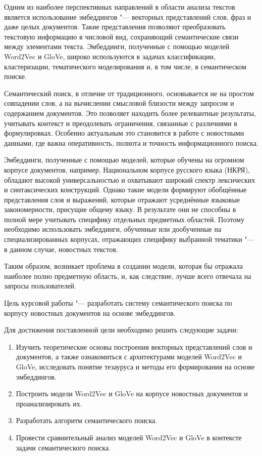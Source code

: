 \documentclass[coursework]{SCWorks}
\begin{document}
Одним из наиболее перспективных направлений в области анализа текстов является использование эмбеддингов "--- векторных представлений слов, фраз и даже целых документов. Такие представления позволяют преобразовать текстовую информацию в числовой вид, сохраняющий семантические связи между элементами текста. Эмбеддинги, полученные с помощью моделей Word2Vec и GloVe, широко используются в задачах классификации, кластеризации, тематического моделирования и, в том числе, в семантическом поиске.

Семантический поиск, в отличие от традиционного, основывается не на простом совпадении слов, а на вычислении смысловой близости между запросом и содержанием документов. Это позволяет находить более релевантные результаты, учитывать контекст и преодолевать ограничения, связанные с различиями в формулировках. Особенно актуальным это становится в работе с новостными данными, где важна оперативность, полнота и точность информационного поиска.

Эмбеддинги, полученные с помощью моделей, которые обучены на огромном корпусе документов, например, Национальном корпусе русского языка (НКРЯ), обладают высокой универсальностью и охватывают широкий спектр лексических и синтаксических конструкций. Однако такие модели формируют обобщённые представления слов и выражений, которые отражают усреднённые языковые закономерности, присущие общему языку. В результате они не способны в полной мере учитывать специфику отдельных предметных областей.
Поэтому необходимо использовать эмбеддинги, обученные или дообученные на специализированных корпусах, отражающих специфику выбранной тематики "--- в данном случае, новостных текстов.

Таким образом, возникает проблема в создании модели, которая бы отражала наиболее полно предметную область, и, как следствие, лучше всего отвечала на запросы пользователей. 

Цель курсовой работы "--- разработать систему семантического поиска по корпусу новостных документов на основе эмбеддингов.

Для достижения поставленной цели необходимо решить следующие задачи:
\begin{enumerate}
    \item Изучить теоретические основы построения векторных представлений слов и документов, а также ознакомиться с архитектурами моделей Word2Vec и GloVe, исследовать понятие тезауруса и методы его формирования на основе эмбеддингов.

    \item Построить модели Word2Vec и GloVe на корпусе новостных документов и проанализировать их.

    \item Разработать алгоритм семантического поиска.

    \item Провести сравнительный анализ моделей Word2Vec и GloVe в контексте задачи семантического поиска.
\end{enumerate}
\end{document}
